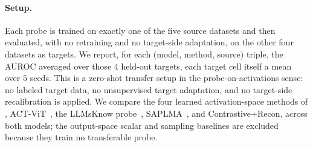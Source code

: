 \paragraph{Setup.}
Each probe is trained on exactly one of the five source datasets and then evaluated, with no retraining and no target-side adaptation, on the other four datasets as targets. We report, for each (model, method, source) triple, the AUROC averaged over those $4$ held-out targets, each target cell itself a mean over $5$ seeds. This is a zero-shot transfer setup in the probe-on-activations sense: no labeled target data, no unsupervised target adaptation, and no target-side recalibration is applied. We compare the four learned activation-space methods of , ACT-ViT~\citep{barshalom2025actvit}, the LLMsKnow probe~\citep{orgad2024llmsknow}, SAPLMA~\citep{azaria2023internal}, and Contrastive+Recon, across both models; the output-space scalar and sampling baselines are excluded because they train no transferable probe.

